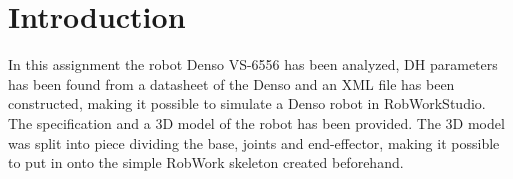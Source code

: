 \section{Introduction}

In this assignment the robot Denso VS-6556 has been analyzed, DH parameters has been found from a datasheet of the Denso and an XML file has been constructed, making it possible to simulate a Denso robot in RobWorkStudio. The specification and a 3D model of the robot has been provided. The 3D model was split into piece dividing the base, joints and end-effector, making it possible to put in onto the simple RobWork skeleton created beforehand.
